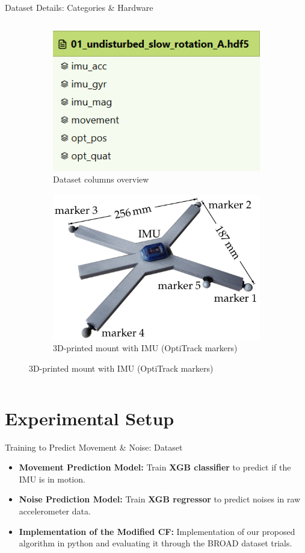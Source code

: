 \documentclass[aspectratio=169,xcolor=dvipsnames]{beamer}
\begin{document}
\begin{frame}{Dataset Details: Categories \& Hardware}
\begin{columns}[T]
  \begin{column}{0.5\textwidth}
    \begin{figure}
      \centering
      \begin{subfigure}[t]{\columnwidth}
        \includegraphics[width=0.5\linewidth]{logos/dataset.png}
        \caption{Dataset columns overview}
        \label{fig:datase}
      \end{subfigure}
      \vspace{0.5em}
      \begin{subfigure}[t]{\columnwidth}
        \includegraphics[width=0.5\linewidth]{logos/imu_hardware_mount.png}
        \caption{3D-printed mount with IMU (OptiTrack markers)}
        \label{fig:IMUhardware}
      \end{subfigure}
    \end{figure}
  \end{column}
\end{columns}
\end{frame}

\section{Experimental Setup}

\begin{frame}{Training to Predict Movement & Noise: Dataset}
\begin{itemize}
    \item \textbf{Movement Prediction Model:} Train \textbf{XGB classifier} to predict if the IMU is in motion.
    \item \textbf{Noise Prediction Model:} Train \textbf{XGB regressor} to predict noises in raw accelerometer data.
    \item \textbf{Implementation of the Modified CF:} Implementation of our proposed algorithm in python and evaluating it through the BROAD dataset trials.
\end{itemize}

\end{frame}
\end{document}
